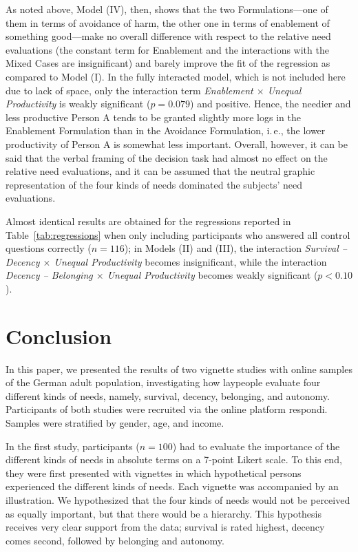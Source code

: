 \documentclass[10pt,letterpaper]{article}
\begin{document}
As noted above, Model (IV), then, shows that the two Formulations---one of them in terms of avoidance of harm, the other one in terms of enablement of something good---make no overall difference with respect to the relative need evaluations (the constant term for Enablement and the interactions with the Mixed Cases are insignificant) and barely improve the fit of the regression as compared to Model (I).
In the fully interacted model, which is not included here due to lack of space, only the interaction term \textit{Enablement $\times$ Unequal Productivity} is weakly significant ($p=0.079$) and positive.
Hence, the needier and less productive Person A tends to be granted slightly more logs in the Enablement Formulation than in the Avoidance Formulation, i.\,e., the lower productivity of Person A is somewhat less important.
Overall, however, it can be said that the verbal framing of the decision task had almost no effect on the relative need evaluations, and it can be assumed that the neutral graphic representation of the four kinds of needs dominated the subjects' need evaluations.

Almost identical results are obtained for the regressions reported in Table~\ref{tab:regressions} when only including participants who answered all control questions correctly ($n=116$); in Models (II) and (III), the interaction \textit{Survival -- Decency $\times$ Unequal Productivity} becomes insignificant, while the interaction \textit{Decency -- Belonging $\times$ Unequal Productivity} becomes weakly significant ($p<0.10$).


\section*{Conclusion}\label{sec:conclusion}
In this paper, we presented the results of two vignette studies with online samples of the German adult population, investigating how laypeople evaluate four different kinds of needs, namely, survival, decency, belonging, and autonomy.
Participants of both studies were recruited via the online platform respondi.
Samples were stratified by gender, age, and income.

In the first study, participants ($n=100$) had to evaluate the importance of the different kinds of needs in absolute terms on a 7-point Likert scale.
To this end, they were first presented with vignettes in which hypothetical persons experienced the different kinds of needs.
Each vignette was accompanied by an illustration.
We hypothesized that the four kinds of needs would not be perceived as equally important, but that there would be a hierarchy.
This hypothesis receives very clear support from the data; survival is rated highest, decency comes second, followed by belonging and autonomy.
\end{document}
